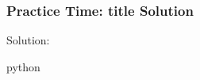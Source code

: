 \begin{{frame}}[fragile]
    \frametitle{{Practice Time: {title} Solution}}

    Solution:
    \begin{{minted}}{{python}}
    \end{{minted}}
\end{{frame}}
